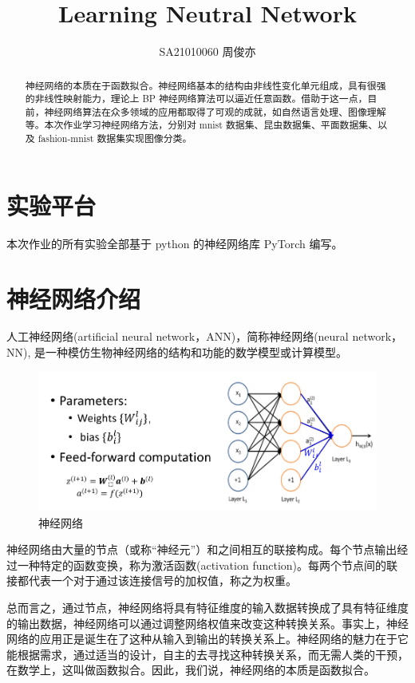 \documentclass[12pt]{article}
\title{\LARGE\textbf{Learning Neutral Network}}
\author{SA21010060 周俊亦}
\date{}
\begin{document}
	\maketitle
	\renewcommand{\abstractname}{Abstract}
	\begin{abstract}
		神经网络的本质在于函数拟合。神经网络基本的结构由非线性变化单元组成，具有很强的非线性映射能力，理论上 BP 神经网络算法可以逼近任意函数。借助于这一点，目前，神经网络算法在众多领域的应用都取得了可观的成就，如自然语言处理、图像理解等。本次作业学习神经网络方法，分别对 mnist 数据集、昆虫数据集、平面数据集、以及 fashion-mnist 数据集实现图像分类。
	\end{abstract}
	
	\section{实验平台}
	
	本次作业的所有实验全部基于 python 的神经网络库 PyTorch 编写。
	
	\section{神经网络介绍}
	
	人工神经网络(artificial neural network，ANN)，简称神经网络(neural network，NN), 是一种模仿生物神经网络的结构和功能的数学模型或计算模型。
	
	\begin{figure}[H]
		\centering
		\includegraphics[width=6in]{./images/nn_model.png}
		\centering
		\caption{神经网络}
	\end{figure}
	
	神经网络由大量的节点（或称“神经元”）和之间相互的联接构成。每个节点输出经过一种特定的函数变换，称为激活函数(activation function)。每两个节点间的联接都代表一个对于通过该连接信号的加权值，称之为权重。
	
	总而言之，通过节点，神经网络将具有特征维度的输入数据转换成了具有特征维度的输出数据，神经网络可以通过调整网络权值来改变这种转换关系。事实上，神经网络的应用正是诞生在了这种从输入到输出的转换关系上。神经网络的魅力在于它能根据需求，通过适当的设计，自主的去寻找这种转换关系，而无需人类的干预，在数学上，这叫做函数拟合。因此，我们说，神经网络的本质是函数拟合。
	
\end{document}
